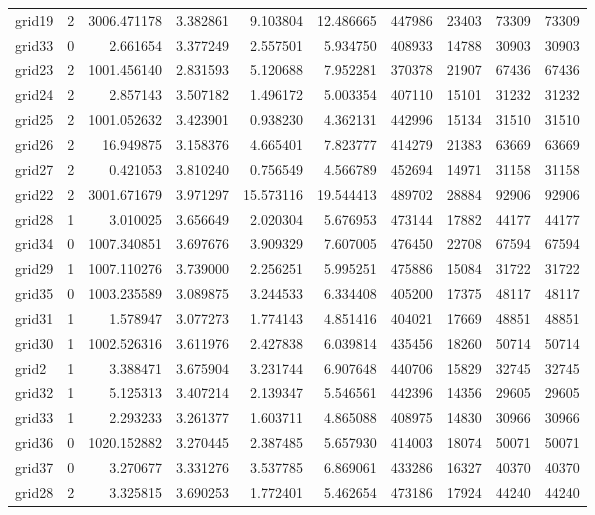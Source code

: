 \begin{longtable}{|l|r|r|r|r|r|r|r|r|r|}
grid19 & 2 & 3006.471178 & 3.382861 & 9.103804 & 12.486665 & 447986 & 23403 & 73309 & 73309 \\
grid33 & 0 & 2.661654 & 3.377249 & 2.557501 & 5.934750 & 408933 & 14788 & 30903 & 30903 \\
grid23 & 2 & 1001.456140 & 2.831593 & 5.120688 & 7.952281 & 370378 & 21907 & 67436 & 67436 \\
grid24 & 2 & 2.857143 & 3.507182 & 1.496172 & 5.003354 & 407110 & 15101 & 31232 & 31232 \\
grid25 & 2 & 1001.052632 & 3.423901 & 0.938230 & 4.362131 & 442996 & 15134 & 31510 & 31510 \\
grid26 & 2 & 16.949875 & 3.158376 & 4.665401 & 7.823777 & 414279 & 21383 & 63669 & 63669 \\
grid27 & 2 & 0.421053 & 3.810240 & 0.756549 & 4.566789 & 452694 & 14971 & 31158 & 31158 \\
grid22 & 2 & 3001.671679 & 3.971297 & 15.573116 & 19.544413 & 489702 & 28884 & 92906 & 92906 \\
grid28 & 1 & 3.010025 & 3.656649 & 2.020304 & 5.676953 & 473144 & 17882 & 44177 & 44177 \\
grid34 & 0 & 1007.340851 & 3.697676 & 3.909329 & 7.607005 & 476450 & 22708 & 67594 & 67594 \\
grid29 & 1 & 1007.110276 & 3.739000 & 2.256251 & 5.995251 & 475886 & 15084 & 31722 & 31722 \\
grid35 & 0 & 1003.235589 & 3.089875 & 3.244533 & 6.334408 & 405200 & 17375 & 48117 & 48117 \\
grid31 & 1 & 1.578947 & 3.077273 & 1.774143 & 4.851416 & 404021 & 17669 & 48851 & 48851 \\
grid30 & 1 & 1002.526316 & 3.611976 & 2.427838 & 6.039814 & 435456 & 18260 & 50714 & 50714 \\
grid2 & 1 & 3.388471 & 3.675904 & 3.231744 & 6.907648 & 440706 & 15829 & 32745 & 32745 \\
grid32 & 1 & 5.125313 & 3.407214 & 2.139347 & 5.546561 & 442396 & 14356 & 29605 & 29605 \\
grid33 & 1 & 2.293233 & 3.261377 & 1.603711 & 4.865088 & 408975 & 14830 & 30966 & 30966 \\
grid36 & 0 & 1020.152882 & 3.270445 & 2.387485 & 5.657930 & 414003 & 18074 & 50071 & 50071 \\
grid37 & 0 & 3.270677 & 3.331276 & 3.537785 & 6.869061 & 433286 & 16327 & 40370 & 40370 \\
grid28 & 2 & 3.325815 & 3.690253 & 1.772401 & 5.462654 & 473186 & 17924 & 44240 & 44240 \\

\end{longtable}
